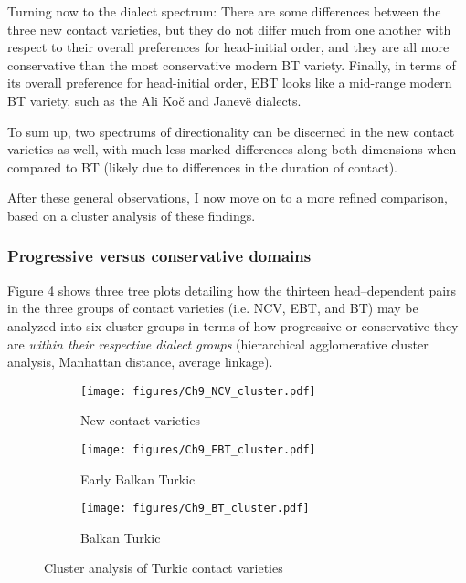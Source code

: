 \documentclass[output=paper,colorlinks,citecolor=brown]{langscibook}
\begin{document}
Turning now to the dialect spectrum: There are some differences between the three new contact varieties, but they do not differ much from one another with respect to their overall preferences for head-initial order, and they are all more conservative than the most conservative modern BT variety. Finally, in terms of its overall preference for head-initial order, EBT looks like a mid-range modern BT variety, such as the Ali Ko\v c and Janev\"e dialects. 

To sum up, two spectrums of directionality can be discerned in the new contact varieties as well, with much less marked differences along both dimensions when compared to BT (likely due to differences in the duration of contact). 

After these general observations, I now move on to a more refined comparison, based on a cluster analysis of these findings. 

\subsubsection{Progressive versus conservative domains}
\label{sec:keskin:cluster_an}

Figure \ref{fig:keskin:clustering} shows three tree plots detailing how the thirteen head--dependent pairs in the three groups of contact varieties (i.e. NCV, EBT, and BT) may be analyzed into six cluster groups in terms of how progressive or conservative they are \textit{within their respective dialect groups} (hierarchical agglomerative cluster analysis, Manhattan distance, average linkage). 

\begin{figure}
  \centering
  \begin{subfigure}{0.49\textwidth}
    \centering
    \texttt{[image: figures/Ch9\_NCV\_cluster.pdf]}
    \caption{New contact varieties}
    \label{fig:keskin:NCV_cluster}
  \end{subfigure}
  \begin{subfigure}{0.49\textwidth}
    \centering
    \texttt{[image: figures/Ch9\_EBT\_cluster.pdf]}
    \caption{Early Balkan Turkic}
    \label{fig:keskin:EBT_cluster}
  \end{subfigure}
  \begin{subfigure}{0.49\textwidth}
    \centering
    \texttt{[image: figures/Ch9\_BT\_cluster.pdf]}
    \caption{Balkan Turkic}
    \label{fig:keskin:BT_cluster}
  \end{subfigure}
  \caption{Cluster analysis of Turkic contact varieties}
  \label{fig:keskin:clustering}
\end{figure}
\end{document}
